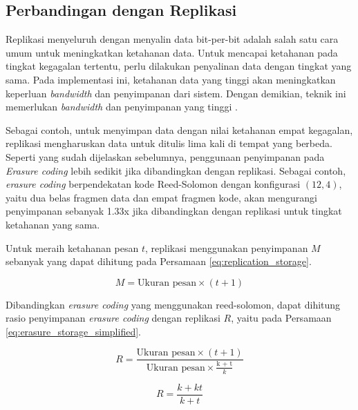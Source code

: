\subsection{Perbandingan dengan Replikasi}

Replikasi menyeluruh dengan menyalin data bit-per-bit adalah salah satu cara umum untuk meningkatkan ketahanan data. Untuk mencapai ketahanan pada tingkat kegagalan tertentu, perlu dilakukan penyalinan data dengan tingkat yang sama. Pada implementasi ini, ketahanan data yang tinggi akan meningkatkan keperluan \textit{bandwidth} dan penyimpanan dari sistem. Dengan demikian, teknik ini memerlukan \textit{bandwidth} dan penyimpanan yang tinggi  \parencite{weatherspoon2002erasure}.

Sebagai contoh, untuk menyimpan data dengan nilai ketahanan empat kegagalan, replikasi mengharuskan data untuk ditulis lima kali di tempat yang berbeda. Seperti yang sudah dijelaskan sebelumnya, penggunaan penyimpanan pada \textit{Erasure coding} lebih sedikit jika dibandingkan dengan replikasi. Sebagai contoh, \textit{erasure coding} berpendekatan kode Reed-Solomon dengan konfigurasi $(12, 4)$, yaitu dua belas fragmen data dan empat fragmen kode, akan mengurangi penyimpanan sebanyak 1.33x jika dibandingkan dengan replikasi untuk tingkat ketahanan yang sama.

Untuk meraih ketahanan pesan $t$, replikasi menggunakan penyimpanan $M$ sebanyak yang dapat dihitung pada Persamaan \ref{eq:replication_storage}.

\begin{equation}
    M = \text{Ukuran pesan} \times (t + 1)
    \label{eq:replication_storage}
\end{equation}

Dibandingkan \textit{erasure coding} yang menggunakan reed-solomon, dapat dihitung rasio penyimpanan \textit{erasure coding} dengan replikasi $R$, yaitu pada Persamaan \ref{eq:erasure_storage_simplified}.

\begin{equation}
    R = \frac{\text{Ukuran pesan} \times (t + 1)}{\text{Ukuran pesan} \times \frac{\text{k + t}}{k}}
    \label{eq:erasure_storage}
\end{equation}

\begin{equation}
    R = \frac{k + kt}{k + t}
    \label{eq:erasure_storage_simplified}
\end{equation}



